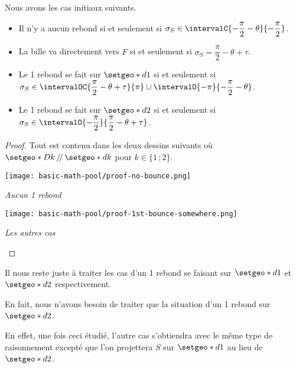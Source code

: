 \begin{fact}
	Nous avons les cas initiaux suivants.
	
	\begin{itemize}[label = \small\textbullet]
		\item Il n'y a aucun rebond si et seulement si $\sigma_S \in \intervalC{- \dfrac{\pi}{2} - \theta}{- \dfrac{\pi}{2}}$.
		
		\item La bille va directement vers $F$ si et seulement si $\sigma_S = \dfrac{\pi}{2} - \theta + \tau$.

		\item Le 1\ier{} rebond se fait sur $\setgeo*{d}{1}$ si et seulement si $\sigma_S \in \intervalOC{\dfrac{\pi}{2} - \theta + \tau}{\pi} \cup \intervalO{- \pi}{- \dfrac{\pi}{2} - \theta}$.

		\item Le 1\ier{} rebond se fait sur $\setgeo*{d}{2}$ si et seulement si $\sigma_S \in \intervalO{- \dfrac{\pi}{2}}{\dfrac{\pi}{2} - \theta + \tau}$.
	\end{itemize}

\end{fact}

\begin{proof}
	Tout est contenu dans les deux dessins suivants où $\setgeo*{D}{k} \, /\!/ \, \setgeo*{d}{k}$ pour $k \in \{ 1 \,; 2\}$.

	\medskip

	\begin{center}
		\texttt{[image: basic-math-pool/proof-no-bounce.png]}

		\itshape\small
		Aucun 1\ier{} rebond
	\end{center}

	\medskip

	\begin{center}
		\texttt{[image: basic-math-pool/proof-1st-bounce-somewhere.png]}

		\itshape\small
		Les autres cas
	\end{center}
\end{proof}


Il nous reste juste à traiter les cas d'un 1\ier{} rebond se faisant sur $\setgeo*{d}{1}$ et $\setgeo*{d}{2}$ respectivement.

\begin{tcolorbox}
	\centering\itshape
	
	En fait, nous n'avons besoin de traiter que la situation d'un 1\ier{} rebond sur $\setgeo*{d}{2}$.
\end{tcolorbox}

En effet, une fois ceci étudié, l'autre cas s'obtiendra avec le même type de raisonnement excepté que l'on projettera $S$ sur $\setgeo*{d}{1}$ au lieu de $\setgeo*{d}{2}$.
